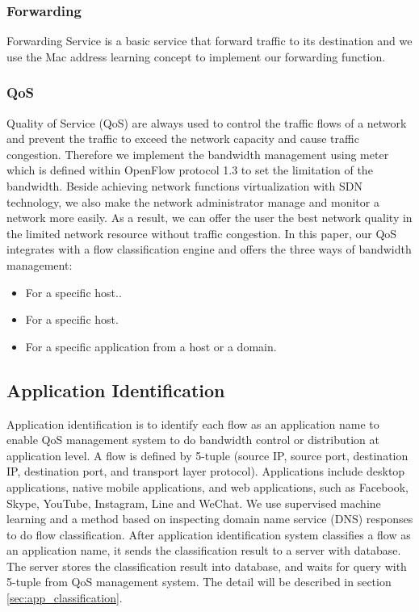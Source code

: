 \documentclass[journal]{IEEEtran}
\begin{document}
\subsubsection{Forwarding}
Forwarding Service is a basic service that forward traffic to its destination
and we use the Mac address learning concept to implement our forwarding function.

\subsubsection{QoS}
Quality of Service (QoS) are always used to control the traffic flows of a network
and prevent the traffic to exceed the network capacity and cause traffic congestion.
Therefore we implement the bandwidth management using meter
which is defined within OpenFlow protocol 1.3 to set the limitation of the bandwidth.
Beside achieving network functions virtualization with SDN technology,
we also make the network administrator manage and monitor a network more easily.
As a result, we can offer the user the best network quality in the limited network resource without traffic congestion.
In this paper, our QoS integrates with a flow classification engine
and offers the three ways of bandwidth management:
\begin{itemize}
\item For a specific host..
\item For a specific host.
\item For a specific application from a host or a domain.
\end{itemize}


\subsection{Application Identification}
Application identification is to identify each flow
as an application name to enable QoS management system to do bandwidth control or distribution at application level.
A flow is defined by 5-tuple (source IP, source port, destination IP, destination port, and transport layer protocol).
Applications include desktop applications, native mobile applications, and web applications,
such as Facebook, Skype, YouTube, Instagram, Line and WeChat.
We use supervised machine learning and a method based on inspecting domain name service (DNS) responses to do flow classification.
After application identification system classifies a flow as an application name,
it sends the classification result to a server with database.
The server stores the classification result into database, and waits for query with 5-tuple from QoS management system.
The detail will be described in section \ref{sec:app_classification}.
\end{document}
